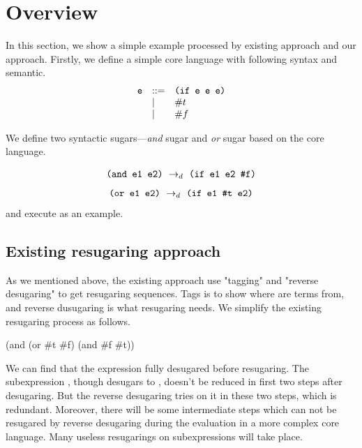 \section{Overview}
\label{sec2}

In this section, we show a simple example processed by existing approach and our approach. Firstly, we define a simple core language with following syntax and semantic.
\[
\begin{array}{lll}
\mbox{\tt e} &::=& \texttt{(if~e~e~e)}\\
& |& \#t\\
& |& \#f
\end{array}
\]

{\rightarrow{}}

We define two syntactic sugars---\emph{and} sugar and \emph{or} sugar based on the core language.

\[
\texttt{(and e1 e2)} ~\rightarrow_d~ \texttt{(if e1 e2 \#f)}
\]
\[
\texttt{(or e1 e2)} ~\rightarrow_d~ \texttt{(if e1 \#t e2)}
\]
and execute  as an example.

\subsection{Existing resugaring approach}
As we mentioned above, the existing approach use "tagging" and "reverse desugaring" to get resugaring sequences. Tags is to show where are terms from, and reverse dusugaring is what resugaring needs. We simplify the existing resugaring process as follows.

\begin{Codes}
    (and (or \#t \#f) (and \#f \#t))
  
 
 
 
\end{Codes}

We can find that the expression fully desugared before resugaring. The subexpression , though desugars to , doesn't be reduced in first two steps after desugaring. But the reverse desugaring tries on it in these two steps, which is redundant. Moreover, there will be some intermediate steps which can not be resugared by reverse desugaring during the evaluation in a more complex core language. Many useless resugarings on subexpressions will take place.

